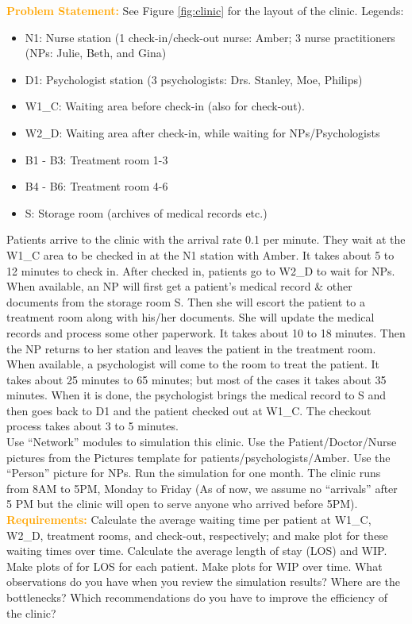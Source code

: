 \documentclass{article}
\begin{document}

\textcolor{orange}{\bf Problem Statement:}  See Figure \ref{fig:clinic} for the layout of the clinic. Legends:
\begin{itemize}
\item N1: Nurse station (1 check-in/check-out nurse: Amber; 3 nurse practitioners (NPs: Julie, Beth, and Gina)
\item D1: Psychologist station (3 psychologists: Drs. Stanley, Moe, Philips)
\item W1\_C: Waiting area before check-in (also for check-out).
\item W2\_D: Waiting area after check-in, while waiting for NPs/Psychologists
\item B1 - B3: Treatment room 1-3
\item B4 - B6: Treatment room 4-6
\item S: Storage room (archives of medical records etc.)
\end{itemize}


Patients arrive to the clinic with the arrival rate 0.1 per minute. They wait at the W1\_C area to be checked in at the N1 station with Amber. It takes about 5 to 12 minutes to check in. After checked in, patients go to W2\_D to wait for NPs. When available, an NP will first get a patient's medical record \& other documents from the storage room S. Then she will escort the patient to a treatment room along with his/her documents. She will update the medical records and process some other paperwork. It takes about 10 to 18 minutes. Then the NP returns to her station and leaves the patient in the treatment room. When available, a psychologist will come to the room to treat the patient. It takes about 25 minutes to 65 minutes; but most of the cases it takes about 35 minutes. When it is done, the psychologist brings the medical record to S and then goes back to D1 and the patient checked out at W1\_C. The checkout process takes about 3 to 5 minutes. \\

Use ``Network'' modules to simulation this clinic.  Use the Patient/Doctor/Nurse pictures from the Pictures template for patients/psychologists/Amber. Use the ``Person'' picture for NPs. Run the simulation for one month. The clinic runs from 8AM to 5PM, Monday to Friday (As of now, we assume no ``arrivals'' after 5 PM but the clinic will open to serve anyone who arrived before 5PM). \\
\vskip 0.15in
\textcolor{orange}{\bf Requirements:} Calculate the average waiting time per patient at W1\_C, W2\_D, treatment rooms, and check-out, respectively; and make plot for these waiting times over time. Calculate the average length of stay (LOS) and WIP. Make plots of for LOS for each patient. Make plots for WIP over time. What observations do you have when you review the simulation results? Where are the bottlenecks? Which recommendations do you have to improve the efficiency of the clinic? \\
\end{document}
